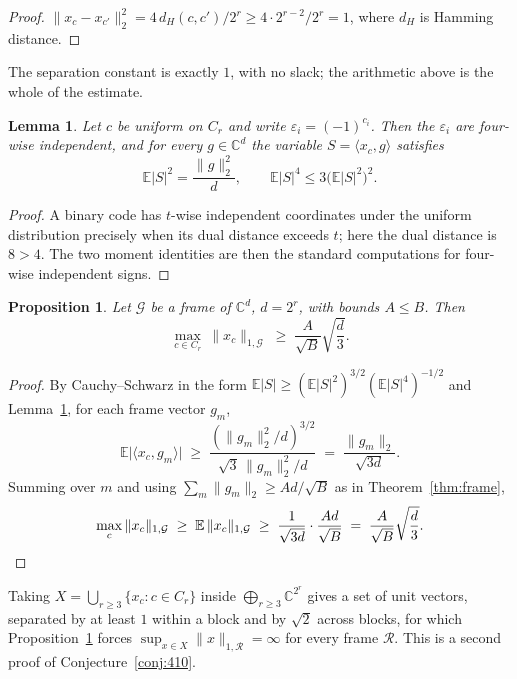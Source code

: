 \documentclass[11pt,reqno]{amsart}
\theoremstyle{plain}
\newtheorem{proposition}[theorem]{Proposition}
\newtheorem{lemma}[theorem]{Lemma}
\theoremstyle{definition}
\theoremstyle{remark}
\newcommand{\C}{\mathbb{C}}
\begin{document}
\begin{proof}
$\|x_c-x_{c'}\|_2^2=4\,d_H(c,c')/2^r\ge4\cdot2^{r-2}/2^r=1$, where
$d_H$ is Hamming distance.
\end{proof}

The separation constant is exactly $1$, with no slack; the arithmetic
above is the whole of the estimate.

\begin{lemma}\label{lem:rm4}
Let $c$ be uniform on $C_r$ and write $\varepsilon_i=(-1)^{c_i}$.  Then
the $\varepsilon_i$ are four-wise independent, and for every
$g\in\C^d$ the variable $S=\langle x_c,g\rangle$ satisfies
\[
  \mathbb{E}|S|^2=\frac{\|g\|_2^2}{d},
  \qquad
  \mathbb{E}|S|^4\le3\bigl(\mathbb{E}|S|^2\bigr)^2 .
\]
\end{lemma}

\begin{proof}
A binary code has $t$-wise independent coordinates under the uniform
distribution precisely when its dual distance exceeds $t$; here the dual
distance is $8>4$.  The two moment identities are then the standard
computations for four-wise independent signs.
\end{proof}

\begin{proposition}\label{prop:rm}
Let $\mathcal{G}$ be a frame of $\C^d$, $d=2^r$, with bounds $A\le B$.
Then
\[
  \max_{c\in C_r}\ \|x_c\|_{1,\mathcal{G}}
  \;\ge\;\frac{A}{\sqrt B}\sqrt{\frac{d}{3}} .
\]
\end{proposition}

\begin{proof}
By Cauchy--Schwarz in the form
$\mathbb{E}|S|\ge(\mathbb{E}|S|^2)^{3/2}(\mathbb{E}|S|^4)^{-1/2}$ and
Lemma~\ref{lem:rm4}, for each frame vector $g_m$,
\[
  \mathbb{E}\bigl|\langle x_c,g_m\rangle\bigr|
  \;\ge\;\frac{(\|g_m\|_2^2/d)^{3/2}}{\sqrt3\,\|g_m\|_2^2/d}
  \;=\;\frac{\|g_m\|_2}{\sqrt{3d}} .
\]
Summing over $m$ and using $\sum_m\|g_m\|_2\ge Ad/\sqrt B$ as in
Theorem~\ref{thm:frame},
\[
  \max_{c}\|x_c\|_{1,\mathcal{G}}
  \;\ge\;\mathbb{E}\,\|x_c\|_{1,\mathcal{G}}
  \;\ge\;\frac1{\sqrt{3d}}\cdot\frac{Ad}{\sqrt B}
  \;=\;\frac{A}{\sqrt B}\sqrt{\frac d3}. \qedhere
\]
\end{proof}

Taking $X=\bigcup_{r\ge3}\{x_c:c\in C_r\}$ inside
$\bigoplus_{r\ge3}\C^{2^r}$ gives a set of unit vectors, separated by at
least $1$ within a block and by $\sqrt2$ across blocks, for which
Proposition~\ref{prop:rm} forces
$\sup_{x\in X}\|x\|_{1,\mathcal{R}}=\infty$ for every frame
$\mathcal{R}$.  This is a second proof of Conjecture~\ref{conj:410}.
\end{document}
